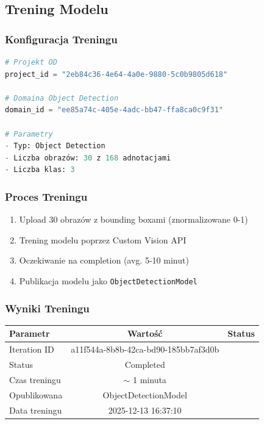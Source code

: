 \subsection{Trening Modelu}

\subsubsection{Konfiguracja Treningu}

\begin{lstlisting}[language=python]
# Projekt OD
project_id = "2eb84c36-4e64-4a0e-9880-5c0b9805d618"

# Domaina Object Detection
domain_id = "ee85a74c-405e-4adc-bb47-ffa8ca0c9f31"

# Parametry
- Typ: Object Detection
- Liczba obrazów: 30 z 168 adnotacjami
- Liczba klas: 3
\end{lstlisting}

\subsubsection{Proces Treningu}

\begin{enumerate}
	\item Upload 30 obrazów z bounding boxami (znormalizowane 0-1)
	\item Trening modelu poprzez Custom Vision API
	\item Oczekiwanie na completion (avg. 5-10 minut)
	\item Publikacja modelu jako \texttt{ObjectDetectionModel}
\end{enumerate}

\subsubsection{Wyniki Treningu}

\begin{center}
	\begin{tabular}{|l|c|l|}
		\hline
		\textbf{Parametr} & \textbf{Wartość} & \textbf{Status} \\
		\hline
		Iteration ID & a11f544a-8b8b-42ca-bd90-185bb7af3d0b &  \\
		Status & Completed &  \\
		Czas treningu & $\sim$ 1 minuta &  \\
		Opublikowana & ObjectDetectionModel & \\
		Data treningu & 2025-12-13 16:37:10 & \\
		\hline
	\end{tabular}
\end{center}

